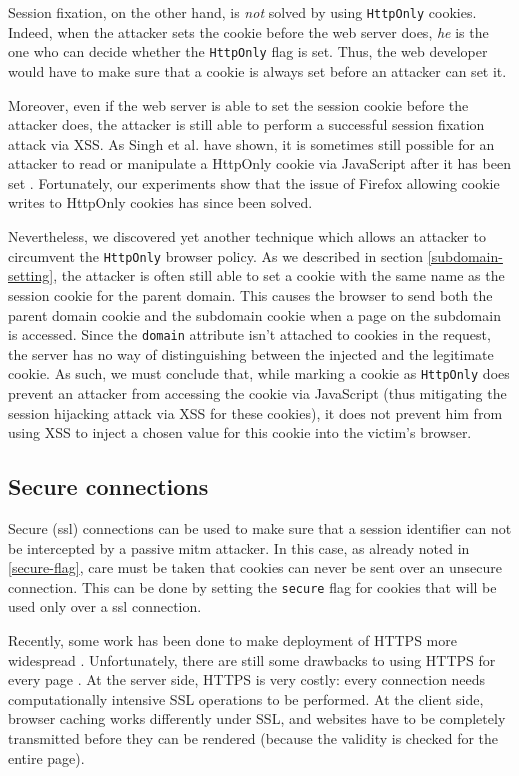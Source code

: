 Session fixation, on the other hand, is \emph{not} solved by using \texttt{HttpOnly} cookies. Indeed, when the attacker sets the cookie before the web server does, \emph{he} is the one who can decide whether the \texttt{HttpOnly} flag is set. Thus, the web developer would have to make sure that a cookie is always set before an attacker can set it.

Moreover, even if the web server is able to set the session cookie before the attacker does, the attacker is still able to perform a successful session fixation attack via XSS. As Singh et al. have shown, it is sometimes still possible for an attacker to read or manipulate a HttpOnly cookie via JavaScript after it has been set \cite{Singh2010}. Fortunately, our experiments show that the issue of Firefox allowing cookie writes to HttpOnly cookies has since been solved.

Nevertheless, we discovered yet another technique which allows an attacker to circumvent the \texttt{HttpOnly} browser policy. As we described in section \ref{subdomain-setting}, the attacker is often still able to set a cookie with the same name as the session cookie for the parent domain. This causes the browser to send both the parent domain cookie and the subdomain cookie when a page on the subdomain is accessed. Since the \texttt{domain} attribute isn't attached to cookies in the request, the server has no way of distinguishing between the injected and the legitimate cookie. As such, we must conclude that, while marking a cookie as \texttt{HttpOnly} does prevent an attacker from accessing the cookie via JavaScript (thus mitigating the session hijacking attack via XSS for these cookies), it does not prevent him from using XSS to inject a chosen value for this cookie into the victim's browser.

\subsection{Secure connections}\label{ssl}

Secure (\gls{ssl}) connections \cite{Stallings2011} can be used to make sure that a session identifier can not be intercepted by a passive \gls{mitm} attacker. In this case, as already noted in \ref{secure-flag}, care must be taken that cookies can never be sent over an unsecure connection. This can be done by setting the \texttt{secure} flag for cookies that will be used only over a \gls{ssl} connection.

Recently, some work has been done to make deployment of HTTPS more widespread \cite{Hodges2010,Jackson2008}. Unfortunately, there are still some drawbacks to using HTTPS for every page \cite{Adida2008}. At the server side, HTTPS is very costly: every connection needs computationally intensive SSL operations to be performed. At the client side, browser caching works differently under SSL, and websites have to be completely transmitted before they can be rendered (because the validity is checked for the entire page).

